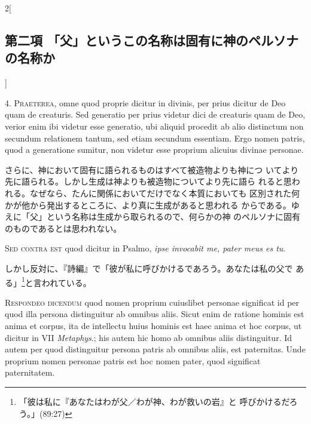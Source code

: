 \documentclass[paper=a4paper,fontsize=10pt,jafontsize=9pt,titlepage]{jlreq}
\begin{document}
\begin{paracol}{2}[\subsection{第二項 「父」というこの名称は固有に神のペルソナの名称か}]


4. {\scshape Praeterea}, omne quod proprie dicitur in divinis, per prius dicitur de
Deo quam de creaturis. Sed generatio per prius videtur dici de
creaturis quam de Deo, verior enim ibi videtur esse generatio, ubi
aliquid procedit ab alio distinctum non secundum relationem tantum,
sed etiam secundum essentiam. Ergo nomen patris, quod a generatione
sumitur, non videtur esse proprium alicuius divinae personae.


\switchcolumn


さらに、神において固有に語られるものはすべて被造物よりも神につ
 いてより先に語られる。しかし生成は神よりも被造物についてより先に語ら
 れると思われる。なぜなら、たんに関係においてだけでなく本質においても
 区別された何かが他から発出するところに、より真に生成があると思われる
 からである。ゆえに「父」という名称は生成から取られるので、何らかの神
 のペルソナに固有のものであるとは思われない。


\switchcolumn*[\subsection{s.c.}]


{\scshape Sed contra est} quod dicitur in Psalmo, {\itshape ipse invocabit me, pater meus
es tu}.


\switchcolumn


しかし反対に、『詩編』で「彼が私に呼びかけるであろう。あなたは私の父で
 ある」\footnote{「彼は私に『あなたはわが父／わが神、わが救いの岩』と
 呼びかけるだろう。」(89:27)}と言われている。




{\scshape Respondeo dicendum} quod nomen proprium cuiuslibet personae significat
id per quod illa persona distinguitur ab omnibus aliis. Sicut enim de
ratione hominis est anima et corpus, ita de intellectu huius hominis
est haec anima et hoc corpus, ut dicitur in VII {\itshape Metaphys}.; his autem
hic homo ab omnibus aliis distinguitur. Id autem per quod distinguitur
persona patris ab omnibus aliis, est paternitas. Unde proprium nomen
personae patris est hoc nomen pater, quod significat paternitatem.



\end{paracol}
\end{document}
